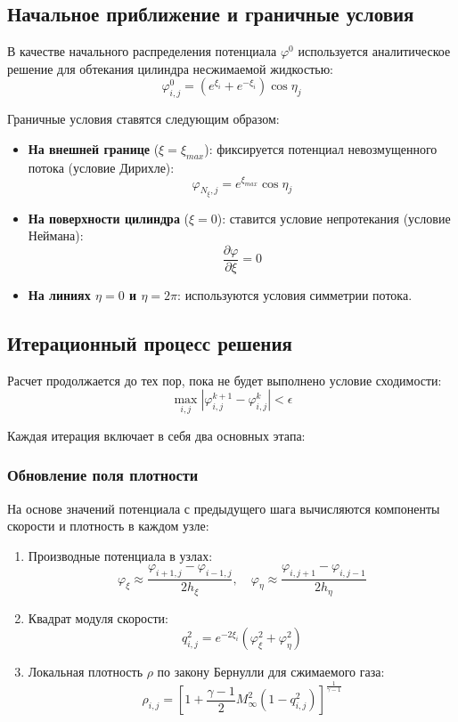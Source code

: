 \subsection{Начальное приближение и граничные условия}

В качестве начального распределения потенциала $\varphi^0$ используется аналитическое решение для обтекания цилиндра несжимаемой жидкостью:
\[ \varphi_{i,j}^0 = (e^{\xi_i} + e^{-\xi_i})\cos\eta_j \]

Граничные условия ставятся следующим образом:
\begin{itemize}
    \item \textbf{На внешней границе} ($\xi = \xi_{max}$): фиксируется потенциал невозмущенного потока (условие Дирихле):
    \[ \varphi_{N_\xi, j} = e^{\xi_{max}} \cos \eta_j \]
    \item \textbf{На поверхности цилиндра} ($\xi = 0$): ставится условие непротекания (условие Неймана):
    \[ \frac{\partial \varphi}{\partial \xi} = 0 \]
    \item \textbf{На линиях $\eta=0$ и $\eta=2\pi$}: используются условия симметрии потока.
\end{itemize}

\subsection{Итерационный процесс решения}

Расчет продолжается до тех пор, пока не будет выполнено условие сходимости:
\[ \max_{i,j} \left| \varphi_{i,j}^{k+1} - \varphi_{i,j}^k \right| < \epsilon \]

Каждая итерация включает в себя два основных этапа:

\subsubsection{Обновление поля плотности}
На основе значений потенциала с предыдущего шага вычисляются компоненты скорости и плотность в каждом узле:
\begin{enumerate}
    \item Производные потенциала в узлах:
    \[ \varphi_\xi \approx \frac{\varphi_{i+1,j} - \varphi_{i-1,j}}{2h_\xi}, \quad \varphi_\eta \approx \frac{\varphi_{i,j+1} - \varphi_{i,j-1}}{2h_\eta} \]
    \item Квадрат модуля скорости:
    \[ q_{i,j}^2 = e^{-2\xi_i} \left( \varphi_\xi^2 + \varphi_\eta^2 \right) \]
    \item Локальная плотность $\rho$ по закону Бернулли для сжимаемого газа:
    \[ \rho_{i,j} = \left[1 + \frac{\gamma-1}{2} M_\infty^2 (1 - q_{i,j}^2)\right]^{\frac{1}{\gamma-1}} \]
\end{enumerate}

